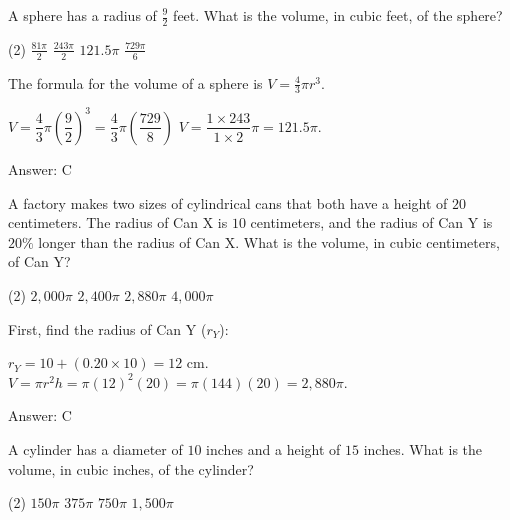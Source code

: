 \documentclass[11pt,paper=a4,answers]{exam}
\begin{document}
\begin{questions}
\vspace{1cm}

\question
A sphere has a radius of $\frac{9}{2}$ feet. What is the volume, in cubic feet, of the sphere?
\begin{tasks}(2)
    \task $\frac{81\pi}{2}$
    \task $\frac{243\pi}{2}$
    \task $121.5\pi$
    \task $\frac{729\pi}{6}$
\end{tasks}

\begin{solution}
The formula for the volume of a sphere is $V = \frac{4}{3}\pi r^3$.
\vspace{5pt}
\begin{center}
$V = \dfrac{4}{3} \pi \left( \dfrac{9}{2} \right)^3 = \dfrac{4}{3} \pi \left( \dfrac{729}{8} \right)$
\vspace{5pt}
$V = \dfrac{1 \times 243}{1 \times 2} \pi = 121.5\pi$.
\end{center}
\vspace{5pt}
Answer: \colorbox{yellow!100}{C}
\end{solution}

\vspace{1cm}

\question
A factory makes two sizes of cylindrical cans that both have a height of $20$ centimeters. The radius of Can X is $10$ centimeters, and the radius of Can Y is $20\%$ longer than the radius of Can X. What is the volume, in cubic centimeters, of Can Y?
\begin{tasks}(2)
    \task $2,000\pi$
    \task $2,400\pi$
    \task $2,880\pi$
    \task $4,000\pi$
\end{tasks}

\begin{solution}
First, find the radius of Can Y ($r_Y$):
\vspace{5pt}
\begin{center}
$r_Y = 10 + (0.20 \times 10) = 12 \text{ cm}$.
\vspace{5pt}
$V = \pi r^2 h = \pi (12)^2 (20) = \pi (144) (20) = 2,880\pi$.
\end{center}
\vspace{5pt}
Answer: \colorbox{yellow!100}{C}
\end{solution}

\vspace{1cm}

\question
A cylinder has a diameter of $10$ inches and a height of $15$ inches. What is the volume, in cubic inches, of the cylinder?
\begin{tasks}(2)
    \task $150\pi$
    \task $375\pi$
    \task $750\pi$
    \task $1,500\pi$
\end{tasks}


\end{questions}
\end{document}
